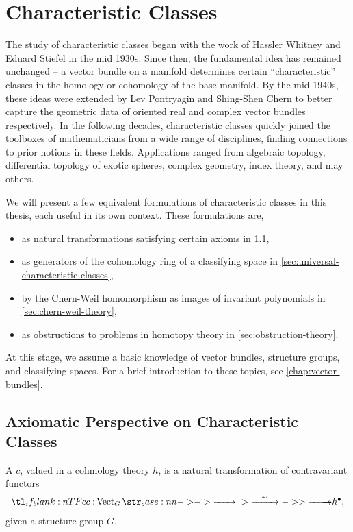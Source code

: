 \pagebreak
\section{Characteristic Classes}
The study of characteristic classes began with the work of Hassler Whitney and Eduard Stiefel in the mid 1930s. Since then, the fundamental idea has remained unchanged -- a vector bundle on a manifold determines certain ``characteristic'' classes in the homology or cohomology of the base manifold.
By the mid 1940s, these ideas were extended by Lev Pontryagin and Shing-Shen Chern to better capture the geometric data of oriented real and complex vector bundles respectively. In the following decades, characteristic classes quickly joined the toolboxes of mathematicians from a wide range of disciplines, finding connections to prior notions in these fields. 
Applications ranged from algebraic topology, differential topology of exotic spheres, complex geometry, index theory, and may others. 

We will present a few equivalent formulations of characteristic classes in this thesis, each useful in its own context. These formulations are, 
\begin{itemize}
	\item as natural transformations satisfying certain axioms in \cref{sec:axiomatic-characteristic-classes},
	\item as generators of the cohomology ring of a classifying space in \cref{sec:universal-characteristic-classes},
	\item by the Chern-Weil homomorphism as images of invariant polynomials in \cref{sec:chern-weil-theory},
	\item as obstructions to problems in homotopy theory in \cref{sec:obstruction-theory}.
\end{itemize}
At this stage, we assume a basic knowledge of vector bundles, structure groups, and classifying spaces. For a brief introduction to these topics, see \cref{chap:vector-bundles}.

\subsection{Axiomatic Perspective on Characteristic Classes}\label{sec:axiomatic-characteristic-classes}

\begin{definition}\label{defn:characteristic-class}
A  $c$, valued in a cohmology theory $h$, is a natural transformation of contravariant functors
\[
	\lkxfunc{c}{\Vect_G}{h^\bullet,}
\]
given a structure group $G$. 
\end{definition}

